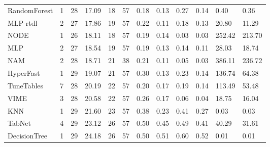 \begin{tabular}{lllllrllllll}
RandomForest & 1 & 28 & 17.09 & 18 & 57 & 0.18 & 0.13 & 0.27 & 0.14 & 0.40 & 0.36 \\
MLP-rtdl & 2 & 27 & 17.86 & 19 & 57 & 0.22 & 0.11 & 0.18 & 0.13 & 20.80 & 11.29 \\
NODE & 1 & 26 & 18.11 & 18 & 57 & 0.19 & 0.14 & 0.03 & 0.03 & 252.42 & 213.70 \\
MLP & 2 & 27 & 18.54 & 19 & 57 & 0.19 & 0.13 & 0.14 & 0.11 & 28.03 & 18.74 \\
NAM & 2 & 28 & 18.71 & 21 & 38 & 0.21 & 0.11 & 0.05 & 0.03 & 386.11 & 236.72 \\
HyperFast & 1 & 29 & 19.07 & 21 & 57 & 0.30 & 0.13 & 0.23 & 0.14 & 136.74 & 64.38 \\
TuneTables & 7 & 28 & 20.19 & 22 & 57 & 0.20 & 0.17 & 0.19 & 0.14 & 113.49 & 53.48 \\
VIME & 3 & 28 & 20.58 & 22 & 57 & 0.26 & 0.17 & 0.06 & 0.04 & 18.75 & 16.04 \\
KNN & 1 & 29 & 21.60 & 23 & 57 & 0.38 & 0.23 & 0.41 & 0.27 & 0.03 & 0.03 \\
TabNet & 4 & 29 & 23.12 & 26 & 57 & 0.50 & 0.45 & 0.49 & 0.41 & 40.29 & 31.61 \\
DecisionTree & 1 & 29 & 24.18 & 26 & 57 & 0.50 & 0.51 & 0.60 & 0.52 & 0.01 & 0.01 \\
\bottomrule
\end{tabular}
